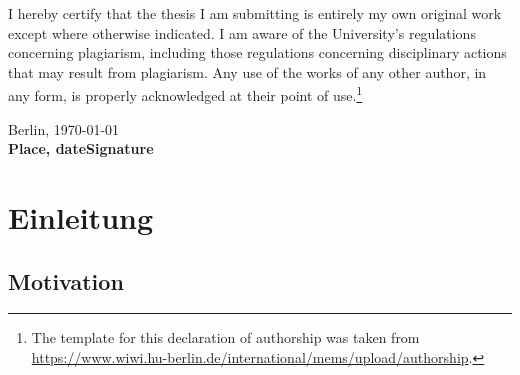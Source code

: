 \documentclass[12pt,twoside]{book}
\begin{document}
I hereby certify that the thesis I am submitting is entirely my own original work except where otherwise indicated. I am aware of the University's regulations concerning plagiarism, including those regulations concerning disciplinary actions that may result from plagiarism. Any use of the works of any other author, in any form, is properly acknowledged at their point of use.\footnote{The template for this declaration of authorship was taken from \url{https://www.wiwi.hu-berlin.de/international/mems/upload/authorship}.}

\vspace{2cm}

Berlin, \today\\
\textbf{Place, date}\hfill\textbf{Signature}

\tableofcontents
\newpage


\chapter{Einleitung}

\section{Motivation}
\end{document}
